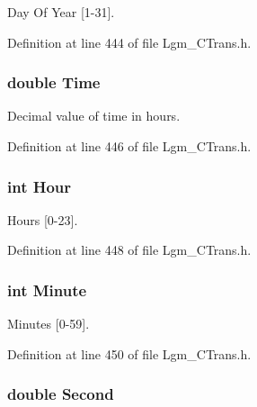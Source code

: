 Day Of Year \mbox{[}1-31\mbox{]}. 



Definition at line 444 of file Lgm\_\-CTrans.h.\hypertarget{struct_lgm___date_time_f51ff88ae9c6c4b9907f516c09ebf68f}{
\subsubsection[{Time}]{\setlength{\rightskip}{0pt plus 5cm}double {\bf Time}}}
\label{struct_lgm___date_time_f51ff88ae9c6c4b9907f516c09ebf68f}


Decimal value of time in hours. 



Definition at line 446 of file Lgm\_\-CTrans.h.\hypertarget{struct_lgm___date_time_9a7e982c278ab66497180395ad975b4b}{
\subsubsection[{Hour}]{\setlength{\rightskip}{0pt plus 5cm}int {\bf Hour}}}
\label{struct_lgm___date_time_9a7e982c278ab66497180395ad975b4b}


Hours \mbox{[}0-23\mbox{]}. 



Definition at line 448 of file Lgm\_\-CTrans.h.\hypertarget{struct_lgm___date_time_361937b5d839c9e24d045e2fb21933ad}{
\subsubsection[{Minute}]{\setlength{\rightskip}{0pt plus 5cm}int {\bf Minute}}}
\label{struct_lgm___date_time_361937b5d839c9e24d045e2fb21933ad}


Minutes \mbox{[}0-59\mbox{]}. 



Definition at line 450 of file Lgm\_\-CTrans.h.\hypertarget{struct_lgm___date_time_660f6df0b5fa2dc75579df0b3980c938}{
\subsubsection[{Second}]{\setlength{\rightskip}{0pt plus 5cm}double {\bf Second}}}
\label{struct_lgm___date_time_660f6df0b5fa2dc75579df0b3980c938}


